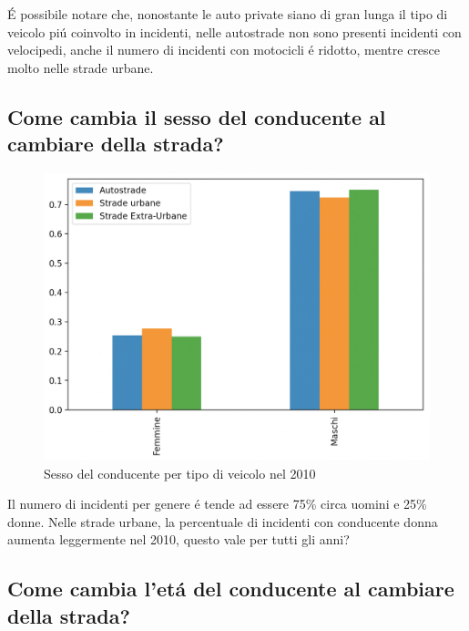 \documentclass[a4paper]{report}
\begin{document}
\'E possibile notare che, nonostante le auto private siano di gran lunga il tipo di veicolo 
pi\'u coinvolto in incidenti, nelle autostrade non sono presenti incidenti con velocipedi, 
anche il numero di incidenti con motocicli \'e ridotto, mentre cresce molto nelle strade urbane.

\newpage
\subsection{Come cambia il sesso del conducente al cambiare della strada?}

\begin{figure}[!ht]
    \includegraphics[width=\linewidth]{../src/incidenti/incidenti_senza_coords/tipo_veicoli/uomo-donna.png}
    \caption{Sesso del conducente per tipo di veicolo nel 2010}
    \label{fig:differenza_uomo_donna}
\end{figure}

Il numero di incidenti per genere \'e tende ad essere 75\% circa uomini e 25\% donne.
Nelle strade  urbane, la percentuale di incidenti con conducente donna aumenta leggermente nel 2010, 
questo vale per tutti gli anni?



\newpage
\subsection{Come cambia l'et\'a del conducente al cambiare della strada?}
\end{document}
